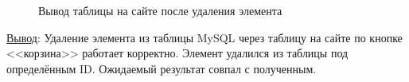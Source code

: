 \begin{figure}[p]
    \caption{Вывод таблицы на сайте после удаления элемента}
    \label{fig:site_table_after_deleting}
\end{figure}

\underline{Вывод}:
Удаление элемента из таблицы MySQL через таблицу на сайте по кнопке <<корзина>> работает корректно. Элемент удалился из таблицы под определённым ID. Ожидаемый результат совпал с полученным.

\newpage